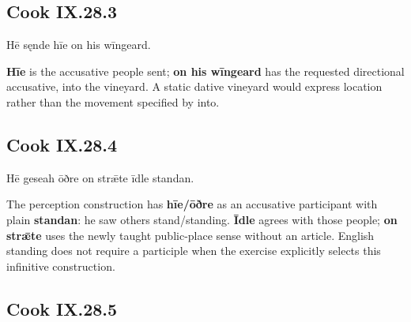 \subsection*{Cook IX.28.3}

\par\begin{minipage}{\linewidth}\raggedright
Hē sęnde hīe on his wīngeard.

\textbf{Hīe} is the accusative people sent; \textbf{on his wīngeard} has the requested directional accusative, into the vineyard. A static dative vineyard would express location rather than the movement specified by into.

\end{minipage}\par\addvspace{4pt}

\subsection*{Cook IX.28.4}

\par\begin{minipage}{\linewidth}\raggedright
Hē geseah ōðre on strǣte īdle standan.

The perception construction has \textbf{hīe/\allowbreak{}ōðre} as an accusative participant with plain \textbf{standan}: he saw others stand/\allowbreak{}standing. \textbf{Īdle} agrees with those people; \textbf{on strǣte} uses the newly taught public-place sense without an article. English standing does not require a participle when the exercise explicitly selects this infinitive construction.

\end{minipage}\par\addvspace{4pt}

\subsection*{Cook IX.28.5}

